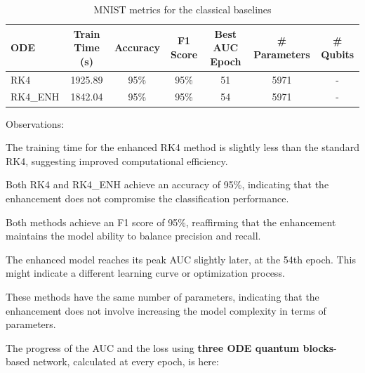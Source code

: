 \documentclass[12pt,a4paper]{report}
\begin{document}
\begin{table}[th]\small\linespread{1}
  \label{tab:classical_MNIST_2}
  \centering
  \begin{tabular}{|l|c|c|c|c|c|c|}
    \hline
    \textbf{ODE} & \textbf{Train Time (s)} & \textbf{Accuracy} & \textbf{F1 Score} & \textbf{Best AUC Epoch} & \textbf{\# Parameters} & \textbf{\# Qubits} \\
    \hline
    RK4          & 1925.89                 & 95\%              & 95\%              & 51                      & 5971                   & -                  \\
    RK4\_ENH     & 1842.04                 & 95\%              & 95\%              & 54                      & 5971                   & -                  \\
    \hline
  \end{tabular}
  \caption{MNIST metrics for the classical baselines}
\end{table}

Observations:

The training time for the enhanced RK4 method is slightly less than the standard RK4, suggesting improved computational efficiency.

Both RK4 and RK4\_ENH achieve an accuracy of 95\%, indicating that the enhancement does not compromise the classification performance.

Both methods achieve an F1 score of 95\%, reaffirming that the enhancement maintains the model ability to balance precision and recall.

The enhanced model reaches its peak AUC slightly later, at the 54th epoch. This might indicate a different learning curve or optimization process.

These methods have the same number of parameters, indicating that the enhancement does not involve increasing the model complexity in terms of parameters.

\clearpage
The progress of the AUC and the loss using \textbf{three ODE quantum blocks}-based network, calculated at every epoch, is here:
\end{document}
